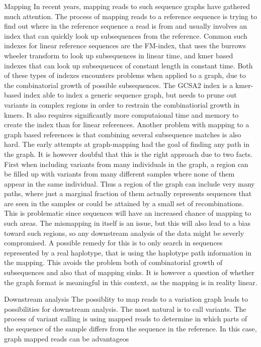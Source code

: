 Mapping
In recent years, mapping reads to such sequence graphs have gathered much attention. The process of mapping reads to a reference sequence is trying to find out where in the reference sequence a read is from and usually involves an index that can quickly look up subsequences from the reference. Common such indexes for linear reference sequences are the FM-index, that uses the burrows wheeler transform to look up subsequences in linear time, and kmer based indexes that can look up subsequences of constant length in constant time. Both of these types of indexes encounters problems when applied to a graph, due to the combinatorial growth of possible subsequences. The GCSA2 index is a kmer-based index able to index a  generic sequence graph, but needs to prune out variants in complex regions in order to restrain the combinatiorial growth in kmers. It also requires significantly more computaional time and memory to create the index than for linear references. Another problem with mapping to a graph based references is that combining several subsequence matches is also hard. 
	The early attempts at graph-mapping had the goal of finding any path in the graph. It is however doubful that this is the right approach due to two facts. First when including variants from many individuals in the graph, a region can be filled up with variants from many different samples where none of them appear in the same individual. Thus a region of the graph can include very many paths, where just a marginal fraction of them actually represents sequences that are seen in the samples or could be attained by a small set of recombinations. This is problematic since sequences will have an increased chance of mapping to such areas. The mismapping in itself is an issue, but this will also lead to a bias toward such regions, so any downstream analysis of the data might be severly compromised. 
	A possible remedy for this is to only search in sequences represented by a real haplotype, that is using the haplotype path information in the mapping. This avoids the problem both of combinatorial growth of subsequences and also that of mapping sinks. It is however a question of whether the graph format is meaningful in this context, as the mapping is in reality linear. 

Downstream analysis
The possiblity to map reads to a variation graph leads to possibilities for downstream analysis. The most natural is to call variants. The process of variant calling is using mapped reads to determine in which parts of the sequence of the sample differs from the sequence in the  reference. In this case, graph mapped reads can be advantageos

